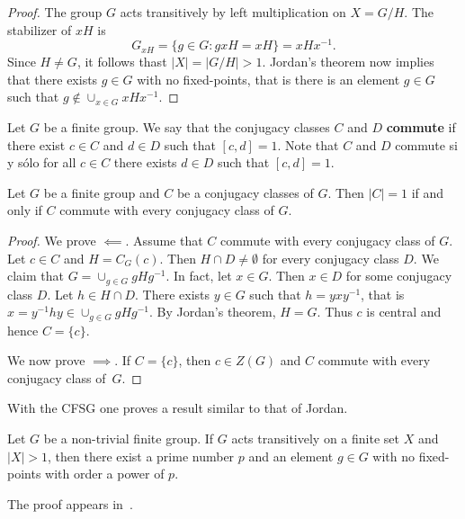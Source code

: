 \begin{proof}
    The group $G$ acts transitively by left multiplication on $X=G/H$. The stabilizer
    of $xH$ is 
    \[
    G_{xH}=\{g\in G:gxH=xH\}=xHx^{-1}.
    \]
    Since $H\ne G$, it follows thast $|X|=|G/H|>1$. Jordan's theorem now implies
    that there exists $g\in G$ with no fixed-points, that is 
    there is an element $g\in G$ such that $g\not\in\cup_{x\in G}xHx^{-1}$. 
\end{proof}

Let $G$ be a finite group. We say that the conjugacy classes $C$ and $D$ 
\textbf{commute} if there exist 
$c\in C$ and $d\in D$ such that $[c,d]=1$. 
Note that $C$ and $D$ commute si y sólo for all $c\in C$ there exists $d\in D$ 
such that $[c,d]=1$. 

\begin{corollary}[Wildon]
    Let $G$ be a finite group and $C$ be a conjugacy classes of $G$. 
    Then $|C|=1$ if and only if $C$ commute 
    with every conjugacy class of $G$.
\end{corollary}
    
\begin{proof}
    We prove $\impliedby$. 
    Assume that $C$ commute with every conjugacy class of $G$. 
    Let $c\in C$ and $H=C_G(c)$. Then $H\cap D\ne\emptyset$ for every conjugacy class
    $D$. We claim that $G=\cup_{g\in G}gHg^{-1}$. In fact, let $x\in G$. Then
    $x\in D$ 
    for some conjugacy class $D$. 
    Let 
    $h\in H\cap D$. There exists $y\in G$ such that $h=yxy^{-1}$, that is
    $x=y^{-1}hy\in \cup_{g\in G}gHg^{-1}$. By Jordan's theorem,  
    $H=G$. Thus $c$ is central and hence $C=\{c\}$. 
    
    We now prove $\implies$. If $C=\{c\}$, then $c\in Z(G)$ and $C$ commute with every 
    conjugacy class of~$G$. 
\end{proof}

With the CFSG one proves a result similar to that of Jordan. 

\begin{theorem}
    Let $G$ be a non-trivial finite group. If $G$ acts transitively
    on a finite set $X$ and $|X|>1$, then
    there exist a prime number $p$ and an element $g\in G$ with no fixed-points
    with order a power of $p$.
\end{theorem}

The proof appears in~\cite{MR636194}. 

